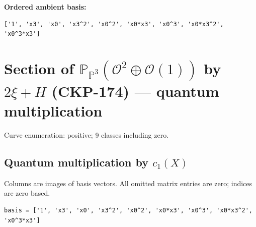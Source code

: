\documentclass[10pt,a4paper]{article}
\begin{document}
\textbf{Ordered ambient basis:}
\begin{lstlisting}
['1', 'x3', 'x0', 'x3^2', 'x0^2', 'x0*x3', 'x0^3', 'x0*x3^2', 'x0^3*x3']
\end{lstlisting}

\clearpage\section*{Section of $\mathbb P_{\mathbb P^{3}}(\mathcal O^{2}\oplus \mathcal O(1))$ by $2\xi +H$ (CKP-174) --- quantum multiplication}

Curve enumeration: positive; 9 classes including zero.
\subsection*{Quantum multiplication by $c_1(X)$}
Columns are images of basis vectors. All omitted matrix entries are zero; indices are zero based.

\begin{lstlisting}
basis = ['1', 'x3', 'x0', 'x3^2', 'x0^2', 'x0*x3', 'x0^3', 'x0*x3^2', 'x0^3*x3']
\end{lstlisting}
\end{document}
